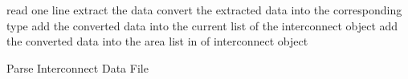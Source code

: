 \setlength{\textfloatsep}{0.2cm}
\begin{algorithm2e}[H]
	{
		read one line\;
		{
			extract the data\;
			convert the extracted data into the corresponding type\;
			{
				add the converted data into the current list of the interconnect object\;
			}
			{
				add the converted data into the area list in of interconnect object\;
			}
		}
	}
	\caption{Parse Interconnect Data File}
	\label{algo:ic_parser}
\end{algorithm2e}
\setlength{\textfloatsep}{0.2cm}